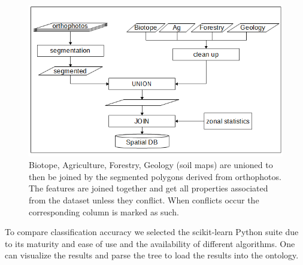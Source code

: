 \documentclass[authoryear, review,12pt,number]{elsarticle}
\begin{document}
\begin{figure} \includegraphics[width=1\textwidth]{diagrams/pre_processing.png}
    \caption{Biotope, Agriculture, Forestry, Geology (soil maps) are unioned to
    then be joined by the segmented polygons derived from orthophotos. The
    features are joined together and get all properties associated from the
    dataset unless they conflict. When conflicts occur the corresponding column
    is marked as such.}
\label{fig_pre-processing}
\end{figure}
To compare classification accuracy we selected the scikit-learn Python suite
\citep{scikit-learn} due to its maturity and ease of use and the availability of
different algorithms. One can visualize the results and parse the tree to load
the results into the ontology.
\end{document}
